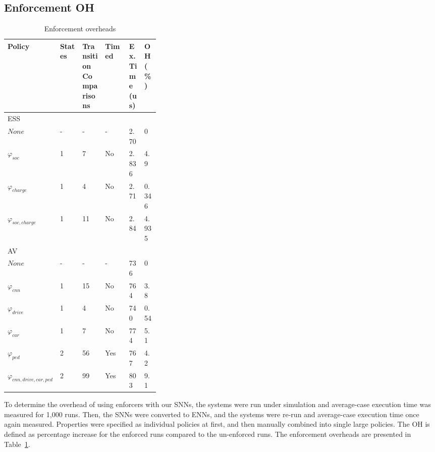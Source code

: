 \subsection{Enforcement \acf{OH}}

\begin{table}[h]
	\vspace{-2mm}
	\centering
        \scriptsize{
	\caption{Enforcement overheads}
	\label{table:policies}
	\begin{tabular}{|l|l|p{0.15\linewidth}|l|p{0.1\linewidth}|p{0.1\linewidth}|}
		\hline Policy & States & Transition Comparisons & Timed &  Ex. Time (us) &  OH (\%) \\ \hline
		\multicolumn{6}{|p{0.70\linewidth}|}{\ac{ESS}} \\ \hline 
		$None$ 										& - & - & - & 2.70 & 0 \\ 	
		$\varphi_{soc}$    							& 1 & 7 & No & 2.836 & 4.9 \\
		$\varphi_{charge}$    						& 1 & 4 & No & 2.71 & 0.346 \\
		$\varphi_{soc,charge}$  	& 1 & 11 & No & 2.84 & 4.935 \\ \hline       
		\multicolumn{6}{|p{0.70\linewidth}|}{\ac{AV}} \\ \hline
		$None$ 						& - & -  & -  & 736 & 0 \\
		$\varphi_{cnn}$ 			& 1 & 15 & No & 764 & 3.8 \\
		$\varphi_{drive}$ 			& 1 & 4 & No & 740 & 0.54 \\
		$\varphi_{car}$ 			& 1 & 7 & No & 774 & 5.1 \\
		$\varphi_{ped}$ 			& 2 & 56 & Yes & 767 & 4.2 \\
		$\varphi_{cnn,drive,car,ped}$ 	
		& 2 & 99 & Yes & 803 & 9.1 \\ \hline           
	\end{tabular}
}
\vspace{-2mm}
\end{table}

To determine the overhead of using enforcers with our \acp{SNN}, the systems were run under simulation and average-case execution time was measured for 1,000 runs. 
Then, the \acp{SNN} were converted to \acp{ENN}, and the systems were re-run and average-case execution time once again measured.
Properties were specified as individual policies at first, and then manually combined into single large policies.
The \acf{OH} is defined as percentage increase for the enforced runs compared to the un-enforced runs.
The enforcement overheads are presented in Table~\ref{table:policies}.


